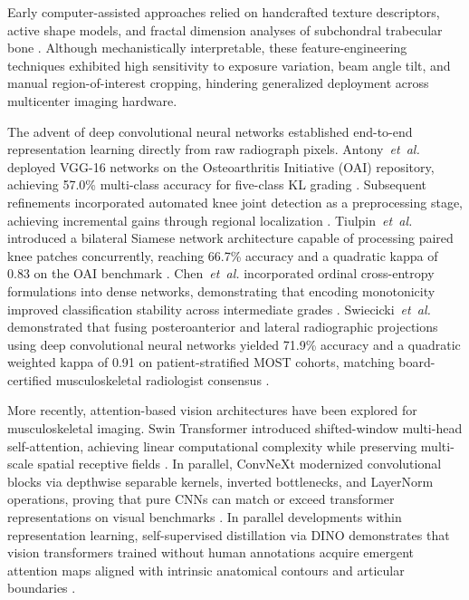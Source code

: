 \documentclass[10pt,journal]{IEEEtran}
\begin{document}
Early computer-assisted approaches relied on handcrafted texture descriptors, active shape models, and fractal dimension analyses of subchondral trabecular bone \cite{shamir2009early, oka2008fully, thomson2015automated}. Although mechanistically interpretable, these feature-engineering techniques exhibited high sensitivity to exposure variation, beam angle tilt, and manual region-of-interest cropping, hindering generalized deployment across multicenter imaging hardware.

The advent of deep convolutional neural networks established end-to-end representation learning directly from raw radiograph pixels. Antony~\textit{et~al.} deployed VGG-16 networks on the Osteoarthritis Initiative (OAI) repository, achieving 57.0\% multi-class accuracy for five-class KL grading \cite{antony2016quantifying}. Subsequent refinements incorporated automated knee joint detection as a preprocessing stage, achieving incremental gains through regional localization \cite{antony2017automatic, bayramoglu2021adaptive}. Tiulpin~\textit{et~al.} introduced a bilateral Siamese network architecture capable of processing paired knee patches concurrently, reaching 66.7\% accuracy and a quadratic kappa of 0.83 on the OAI benchmark \cite{tiulpin2018automatic}. Chen~\textit{et~al.} incorporated ordinal cross-entropy formulations into dense networks, demonstrating that encoding monotonicity improved classification stability across intermediate grades \cite{chen2019fully}. Swiecicki~\textit{et~al.} demonstrated that fusing posteroanterior and lateral radiographic projections using deep convolutional neural networks yielded 71.9\% accuracy and a quadratic weighted kappa of 0.91 on patient-stratified MOST cohorts, matching board-certified musculoskeletal radiologist consensus \cite{swiecicki2021deep}.

More recently, attention-based vision architectures have been explored for musculoskeletal imaging. Swin Transformer introduced shifted-window multi-head self-attention, achieving linear computational complexity while preserving multi-scale spatial receptive fields \cite{liu2021swin}. In parallel, ConvNeXt modernized convolutional blocks via depthwise separable kernels, inverted bottlenecks, and LayerNorm operations, proving that pure CNNs can match or exceed transformer representations on visual benchmarks \cite{liu2022convnext}. In parallel developments within representation learning, self-supervised distillation via DINO demonstrates that vision transformers trained without human annotations acquire emergent attention maps aligned with intrinsic anatomical contours and articular boundaries \cite{caron2021dino}.
\end{document}
